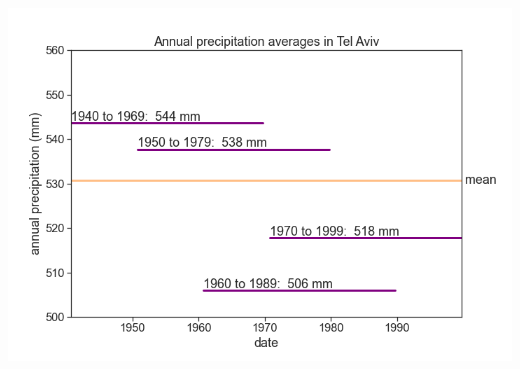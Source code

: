 \documentclass[
  letterpaper,
  DIV=11,
  numbers=noendperiod]{scrreprt}
\begin{document}
\includegraphics{archive/figures/mean_tel_aviv_4_windows.png}
\end{document}
